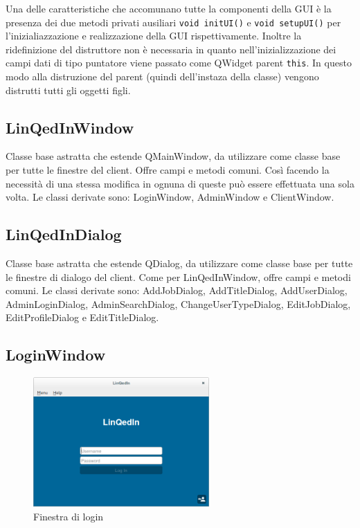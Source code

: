 \documentclass[a4paper]{article}
\begin{document}
Una delle caratteristiche che accomunano tutte la componenti della GUI è la presenza dei due metodi privati ausiliari \texttt{void initUI()} e \texttt{void setupUI()} per l'inizialiazzazione e realizzazione della GUI rispettivamente. Inoltre la ridefinizione del distruttore non è necessaria in quanto nell'inizializzazione dei campi dati di tipo puntatore viene passato come QWidget parent \texttt{this}. In questo modo alla distruzione del parent (quindi dell'instaza della classe) vengono distrutti tutti gli oggetti figli.

\subsection*{LinQedInWindow}
Classe base astratta che estende QMainWindow, da utilizzare come classe base per tutte le finestre del client. Offre campi e metodi comuni. Così facendo la necessità di una stessa modifica in ognuna di queste può essere effettuata una sola volta. Le classi derivate sono: LoginWindow, AdminWindow e ClientWindow.

\subsection*{LinQedInDialog}
Classe base astratta che estende QDialog, da utilizzare come classe base per tutte le finestre di dialogo del client. Come per LinQedInWindow, offre campi e metodi comuni. Le classi derivate sono: AddJobDialog, AddTitleDialog, AddUserDialog, AdminLoginDialog, AdminSearchDialog, ChangeUserTypeDialog, EditJobDialog, EditProfileDialog e EditTitleDialog.

\subsection*{LoginWindow}
\begin{figure}[!ht]
\centering
\includegraphics[width=0.6\textwidth]{LoginWindow.png}
\caption{Finestra di login}
\end{figure}
\end{document}
